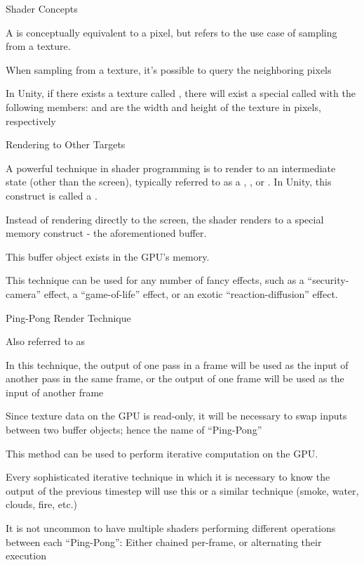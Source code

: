 \documentclass[11pt]{article}
\begin{document}
\maketitle

\begin{topic}{Shader Concepts}
	\item A  is conceptually equivalent to a pixel, but refers to the use case of sampling from a texture.
	\item When sampling from a texture, it's possible to query the neighboring pixels
	\item In Unity, if there exists a texture called , there will exist a special  called  with the following members:  and  are the width and height of the texture in pixels, respectively
\end{topic}

\begin{topic}{Rendering to Other Targets}
	\item A powerful technique in shader programming is to render to an intermediate state (other than the screen), typically referred to as a , , or . In Unity, this construct is called a .
	\item Instead of rendering directly to the screen, the shader renders to a special memory construct - the aforementioned buffer.
	\item This buffer object exists in the GPU's memory.
	\item This technique can be used for any number of fancy effects, such as a ``security-camera'' effect, a ``game-of-life'' effect, or an exotic ``reaction-diffusion'' effect.
\end{topic}

\begin{topic}{Ping-Pong Render Technique}
	\item Also referred to as 
	\item In this technique, the output of one pass in a frame will be used as the input of another pass in the same frame, or the output of one frame will be used as the input of another frame
	\item Since texture data on the GPU is read-only, it will be necessary to swap inputs between two buffer objects; hence the name of ``Ping-Pong''
	\item This method can be used to perform iterative computation on the GPU.
	\item Every sophisticated iterative technique in which it is necessary to know the output of the previous timestep will use this or a similar technique (smoke, water, clouds, fire, etc.)
	\item It is not uncommon to have multiple shaders performing different operations between each ``Ping-Pong'': Either chained per-frame, or alternating their execution
\end{topic}
\end{document}
